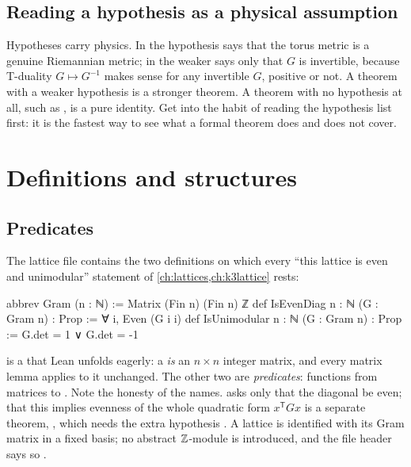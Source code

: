 \subsection{Reading a hypothesis as a physical assumption}
Hypotheses carry physics. In  the hypothesis 
says that the torus metric is a genuine Riemannian metric; in  the
weaker  says only that $G$ is invertible, because T-duality
$G\mapsto G^{-1}$ makes sense for any invertible $G$, positive or not. A theorem with a
weaker hypothesis is a stronger theorem. A theorem with no hypothesis at all, such as
, is a pure identity. Get into the habit of reading the hypothesis
list first: it is the fastest way to see what a formal theorem does and does not cover.

\section{Definitions and structures}\label{sec:leanprimer:structures}

\subsection{Predicates}
The lattice file  contains the two definitions on
which every ``this lattice is even and unimodular'' statement of \cref{ch:lattices,ch:k3lattice}
rests:
\begin{leancode}
abbrev Gram (n : ℕ) := Matrix (Fin n) (Fin n) ℤ
def IsEvenDiag {n : ℕ} (G : Gram n) : Prop := ∀ i, Even (G i i)
def IsUnimodular {n : ℕ} (G : Gram n) : Prop := G.det = 1 ∨ G.det = -1
\end{leancode}
 is a  that Lean unfolds eagerly: a  \emph{is} an
$n\times n$ integer matrix, and every matrix lemma applies to it unchanged. The other two
are \emph{predicates}: functions from matrices to . Note the
honesty of the names.  asks only that the diagonal be even; that this
implies evenness of the whole quadratic form $x^{\mathsf T}Gx$ is a separate theorem,
, which needs the extra hypothesis
. A lattice is identified with its Gram matrix in a fixed basis; no abstract
$\mathbb{Z}$-module is introduced, and the file header says so
.

